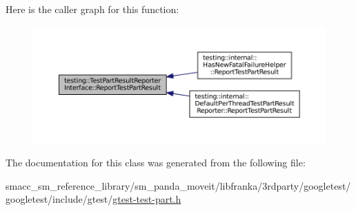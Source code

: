 Here is the caller graph for this function\+:
\nopagebreak
\begin{figure}[H]
\begin{center}
\leavevmode
\includegraphics[width=350pt]{classtesting_1_1TestPartResultReporterInterface_aa2f920e7a5a0a6d0faf19e3727928c22_icgraph}
\end{center}
\end{figure}


The documentation for this class was generated from the following file\+:\begin{DoxyCompactItemize}
\item 
smacc\+\_\+sm\+\_\+reference\+\_\+library/sm\+\_\+panda\+\_\+moveit/libfranka/3rdparty/googletest/googletest/include/gtest/\hyperlink{gtest-test-part_8h}{gtest-\/test-\/part.\+h}\end{DoxyCompactItemize}
